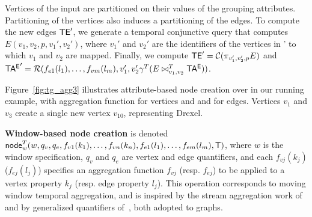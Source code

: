 Vertices of the input are partitioned on their values of the grouping
attributes.  Partitioning of the vertices also induces a partitioning
of the edges. To compute the new edges $\textsf{TE}'$, we generate a temporal
conjunctive query that computes $E(v_1,v_2,p,v_1',v_2')$, where $v_1'$
and $v_2'$ are the identifiers of the vertices in \tv' to which $v_1$
and $v_2$ are mapped.  Finally, we compute $\textsf{TE}' =
\mathcal{C}(\pi_{v_1',v_2',p}E)$ and\\ $\mathsf{TA^{E}}' =
\mathcal{R}(f_{e1}(l_1),\ldots,f_{vm}(l_m),v_1',v_2' \gamma^T (E
  \bowtie^T_{v_1,v_2} \mathsf{TA^{E}}))$.

Figure~\ref{fig:tg_agg3} illustrates attribute-based node creation
over  in our running example, with 
aggregation function for vertices and and  for edges.
Vertices $v_1$ and $v_3$ create a single new vertex $v_10$,
representing Drexel.

{\bf Window-based node creation} is denoted\\
$\textsf{node}^T_w(w,q_v,q_e,f_{v1}(k_1),\ldots,f_{vn}(k_n),f_{e1}(l_1),\ldots,f_{em}(l_m),\mathsf{T})$,
where $w$ is the window specification, $q_v$ and $q_e$ are vertex and
edge quantifiers, and each $f_{vj}(k_j)$ ($f_{ej}(l_j)$) specifies an
aggregation function $f_{vj}$ (resp. $f_{ej}$) to be applied to a
vertex property $k_j$ (resp. edge property $l_j$).  This operation
corresponds to moving window temporal aggregation, and is inspired by
the stream aggregation work of~\cite{Li2005} and by generalized
quantifiers of~\cite{Hsu1995}, both adopted to graphs.




